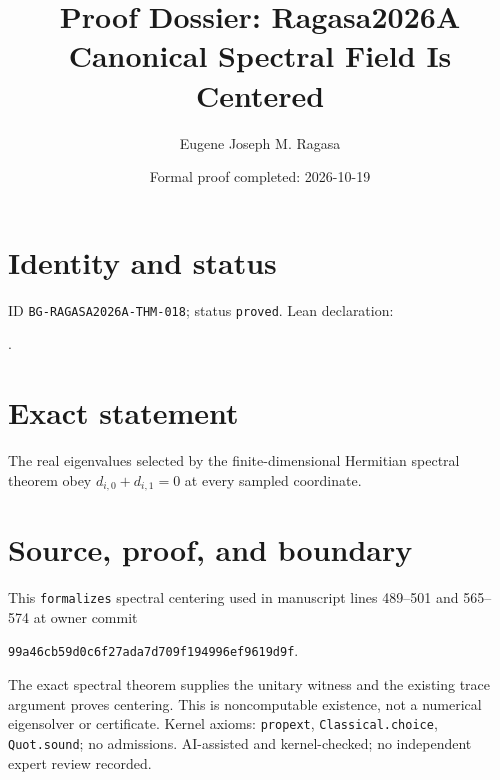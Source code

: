 \documentclass[11pt]{article}
\title{Proof Dossier: Ragasa2026A Canonical Spectral Field Is Centered}\author{Eugene Joseph M. Ragasa}\date{Formal proof completed: 2026-10-19}
\begin{document}
\maketitle
\section{Identity and status}
ID \texttt{BG-RAGASA2026A-THM-018}; status \texttt{proved}. Lean declaration:
\par{}.
\section{Exact statement}
The real eigenvalues selected by the finite-dimensional Hermitian spectral theorem obey
$d_{i,0}+d_{i,1}=0$ at every sampled coordinate.
\section{Source, proof, and boundary}
This \texttt{formalizes} spectral centering used in manuscript lines 489--501 and 565--574
at owner commit
\begin{center}\small\texttt{99a46cb59d0c6f27ada7d709f194996ef9619d9f}.\end{center}
The exact spectral theorem supplies the unitary witness and the existing trace argument
proves centering. This is noncomputable existence, not a numerical eigensolver or
certificate. Kernel axioms: \texttt{propext}, \texttt{Classical.choice},
\texttt{Quot.sound}; no admissions. AI-assisted and kernel-checked; no independent expert
review recorded.
\end{document}
